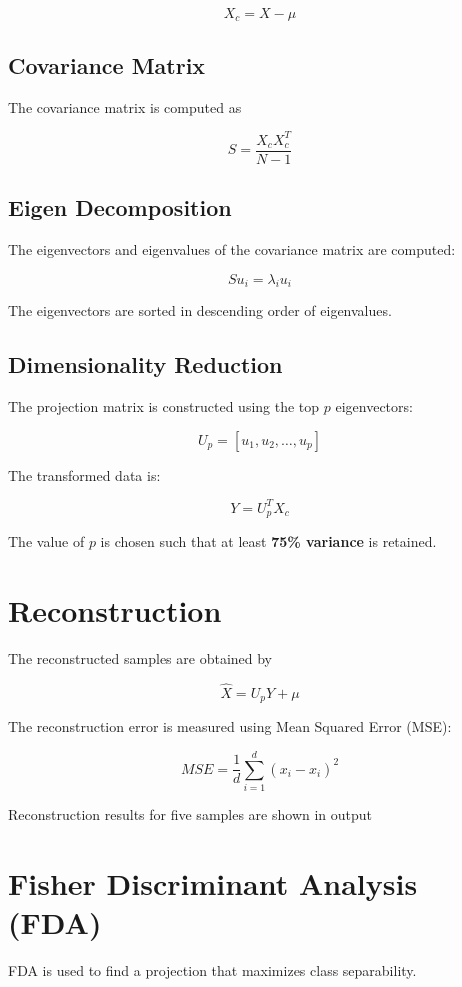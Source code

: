 \documentclass[12pt]{article}
\begin{document}
\[
X_c = X - \mu
\]

\subsection{Covariance Matrix}

The covariance matrix is computed as

\[
S = \frac{X_c X_c^T}{N-1}
\]

\subsection{Eigen Decomposition}

The eigenvectors and eigenvalues of the covariance matrix are computed:

\[
S u_i = \lambda_i u_i
\]

The eigenvectors are sorted in descending order of eigenvalues.

\subsection{Dimensionality Reduction}

The projection matrix is constructed using the top $p$ eigenvectors:

\[
U_p = [u_1,u_2,\dots,u_p]
\]

The transformed data is:

\[
Y = U_p^T X_c
\]

The value of $p$ is chosen such that at least \textbf{75\% variance} is retained.

\section{Reconstruction}

The reconstructed samples are obtained by

\[
\hat{X} = U_p Y + \mu
\]

The reconstruction error is measured using Mean Squared Error (MSE):

\[
MSE = \frac{1}{d}\sum_{i=1}^{d}(x_i - \hat{x}_i)^2
\]

Reconstruction results for five samples are shown in output


\section{Fisher Discriminant Analysis (FDA)}

FDA is used to find a projection that maximizes class separability.
\end{document}
